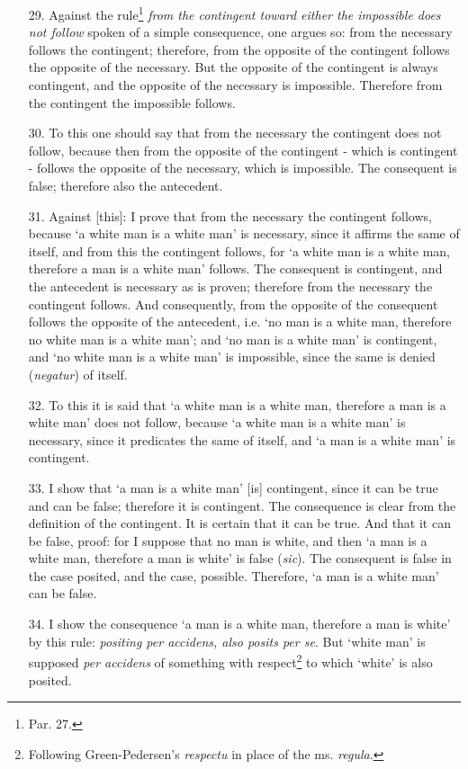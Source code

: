 \documentclass[]{article}
\begin{document}
\begin{enumerate}
\item[29.] Against the rule\footnote{Par. 27.} \textit{from the contingent toward either the impossible does not follow} spoken of a simple consequence, one argues so: from the necessary follows the contingent; therefore, from the opposite of the contingent follows the opposite of the necessary. But the opposite of the contingent is always contingent, and the opposite of the necessary is impossible. Therefore from the contingent the impossible follows.
\item[30.] To this one should say that from the necessary the contingent does not follow, because then from the opposite of the contingent - which is contingent - follows the opposite of the necessary, which is impossible. The consequent is false; therefore also the antecedent.
\item[31.] Against [this]: I prove that from the necessary the contingent follows, because `a white man is a white man' is necessary, since it affirms the same of itself, and from this the contingent follows, for `a white man is a white man, therefore a man is a white man' follows. The consequent is contingent, and the antecedent is necessary as is proven; therefore from the necessary the contingent follows. And consequently, from the opposite of the consequent follows the opposite of the antecedent, i.e. `no man is a white man, therefore no white man is a white man'; and `no man is a white man' is contingent, and `no white man is a white man' is impossible, since the same is denied (\textit{negatur}) of itself.
\item[32.] To this it is said that `a white man is a white man, therefore a man is a white man' does not follow, because `a white man is a white man' is necessary, since it predicates the same of itself, and `a man is a white man' is contingent.
\item[33.] I show that `a man is a white man' [is] contingent, since it can be true and can be false; therefore it is contingent. The consequence is clear from the definition of the contingent. It is certain that it can be true. And that it can be false, proof: for I suppose that no man is white, and then `a man is a white man, therefore a man is white' is false (\textit{sic}). The consequent is false in the case posited, and the case, possible. Therefore, `a man is a white man' can be false.
\item[34.] I show the consequence `a man is a white man, therefore a man is white' by this rule: \textit{positing per accidens, also posits per se}. But `white man' is supposed \textit{per accidens} of something with respect\footnote{Following Green-Pedersen's \textit{respectu} in place of the ms. \textit{regula}.} to which `white' is also posited.

\end{enumerate}
\end{document}
